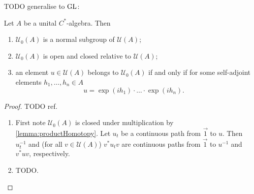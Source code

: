 TODO generalise to $\operatorname{GL}$:
\begin{lemma} \label{lemma:sectionConnectedToIdentity}
Let $A$ be a unital $C^*$-algebra. Then
\begin{enumerate}
\item $\mathcal{U}_0(A)$ is a normal subgroup of $\mathcal{U}(A)$;
\item $\mathcal{U}_0(A)$ is open and closed relative to $\mathcal{U}(A)$;
\item an element $u\in \mathcal{U}(A)$ belongs to $\mathcal{U}_0(A)$ \textup{if and only if} for some self-adjoint elements $h_1,\ldots, h_n \in A$
\[ u = \exp(ih_1)\cdot \ldots \cdot \exp(ih_n). \]
\end{enumerate}
\end{lemma}
\begin{proof}
TODO ref.
\begin{enumerate}
\item First note $\mathcal{U}_0(A)$ is closed under multiplication by \ref{lemma:productHomotopy}. Let $u_t$ be a continuous path from $\vec{1}$ to $u$. Then $u_t^{-1}$ and (for all $v\in \mathcal{U}(A)$) $v^*u_t v$ are continuous paths from $\vec{1}$ to $u^{-1}$ and $v^*uv$, respectively.
\item TODO.
\end{enumerate}
\end{proof}

